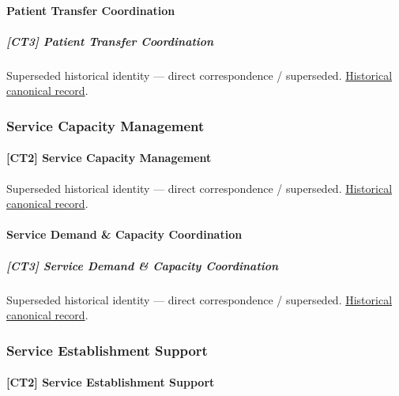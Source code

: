 \paragraph{Patient Transfer Coordination}

\subparagraph{[CT3] Patient Transfer Coordination}

\par\label{element:b5a76d4877424b2ea9b01fb5fa22772c}
Superseded historical identity — direct correspondence / superseded. \href{../../../../continuum/strategy/capability/b5a76d4877424b2ea9b01fb5fa22772c.md}{Historical canonical record}.\par

\subsubsection{Service Capacity Management}

\paragraph{[CT2] Service Capacity Management}

\par\label{element:ac205f374c9d41c3b6d18a6b7c356152}
Superseded historical identity — direct correspondence / superseded. \href{../../../../continuum/strategy/capability/ac205f374c9d41c3b6d18a6b7c356152.md}{Historical canonical record}.\par

\paragraph{Service Demand \& Capacity Coordination}

\subparagraph{[CT3] Service Demand \& Capacity Coordination}

\par\label{element:b57081e650f74ad488549fdaa5305bcb}
Superseded historical identity — direct correspondence / superseded. \href{../../../../continuum/strategy/capability/b57081e650f74ad488549fdaa5305bcb.md}{Historical canonical record}.\par

\subsubsection{Service Establishment Support}

\paragraph{[CT2] Service Establishment Support}

